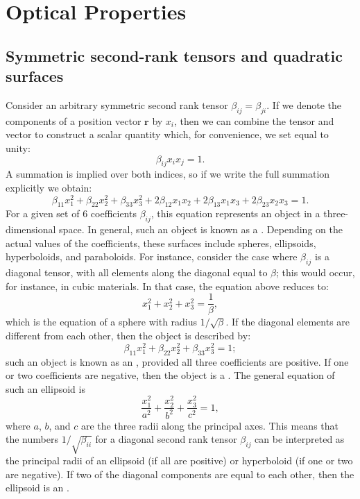 \section{Optical Properties}\label{\chabbr:sec:optical}

\subsection{Symmetric second-rank tensors and quadratic surfaces}\label{\chabbr:sec:quadrics}

Consider an arbitrary symmetric second rank tensor $\beta_{ij}=\beta_{ji}$.  If we denote the components of a position vector $\mathbf{r}$ by $x_i$, then we can combine the tensor and vector to construct a scalar quantity which, for convenience, we set equal to unity:
\[
	\beta_{ij}x_ix_j = 1.
\]
A summation is implied over both indices, so if we write the full summation explicitly we obtain:
\[
	\beta_{11}x_1^2+\beta_{22}x_2^2+\beta_{33}x_3^2 + 2\beta_{12}x_1x_2+2\beta_{13}x_1x_3+2\beta_{23}x_2x_3=1.
\]
For a given set of $6$ coefficients $\beta_{ij}$, this equation represents an object in a three-dimensional space.  In general, such an object is known as a .  Depending on the actual values of the coefficients, these surfaces include spheres, ellipsoids, hyperboloids, and paraboloids.  For instance, consider the case where $\beta_{ij}$ is a diagonal tensor, with all elements along the diagonal equal to $\beta$; this would occur, for instance, in cubic materials.  In that case, the equation above reduces to:
\[
	x_1^2 + x_2^2+x_3^2 = \frac{1}{\beta},
\]
which is the equation of a sphere with radius $1/\sqrt{\beta}$.  If the diagonal elements are different from each other, then the object is described by:
\[
	\beta_{11}x_1^2+\beta_{22}x_2^2+\beta_{33}x_3^2=1;
\]
such an object is known as an , provided all three coefficients are positive.  If one or two coefficients are negative, then the object is a .  The general equation of such an ellipsoid is
\[
	\frac{x_1^2}{a^2} + \frac{x_2^2}{b^2} + \frac{x_3^2}{c^2} = 1,
\]
where $a$, $b$, and $c$ are the three radii along the principal axes.  This means that the numbers $1/\sqrt{\beta_{ii}}$ for a  diagonal second rank tensor $\beta_{ij}$ can be interpreted as the principal radii of an ellipsoid (if all are positive) or  hyperboloid (if one or two are negative).  If two of the diagonal components are equal to each other, then the ellipsoid is an .

